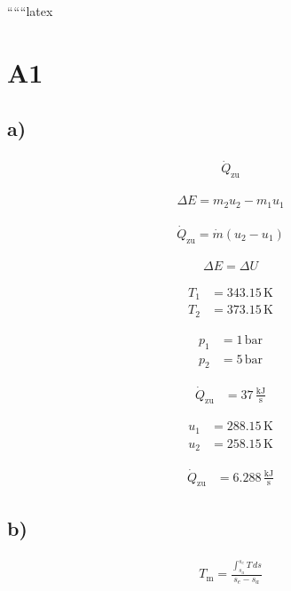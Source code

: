 
``````latex


\section*{A1}

\subsection*{a)}

\begin{align*}
\dot{Q}_{\text{zu}} 
\end{align*}

\begin{align*}
\Delta E = m_2 u_2 - m_1 u_1
\end{align*}

\begin{align*}
\dot{Q}_{\text{zu}} = \dot{m} (u_2 - u_1)
\end{align*}

\begin{align*}
\Delta E = \Delta U
\end{align*}

\begin{align*}
T_1 &= 343.15 \, \text{K} \\
T_2 &= 373.15 \, \text{K}
\end{align*}

\begin{align*}
p_1 &= 1 \, \text{bar} \\
p_2 &= 5 \, \text{bar}
\end{align*}

\begin{align*}
\dot{Q}_{\text{zu}} &= 37 \, \frac{\text{kJ}}{\text{s}}
\end{align*}

\begin{align*}
u_1 &= 288.15 \, \text{K} \\
u_2 &= 258.15 \, \text{K}
\end{align*}

\begin{align*}
\dot{Q}_{\text{zu}} &= 6.288 \, \frac{\text{kJ}}{\text{s}}
\end{align*}

\subsection*{b)}

\begin{align*}
T_{\text{m}} = \frac{\int_{s_a}^{s_e} T \, ds}{s_e - s_a}
\end{align*}

